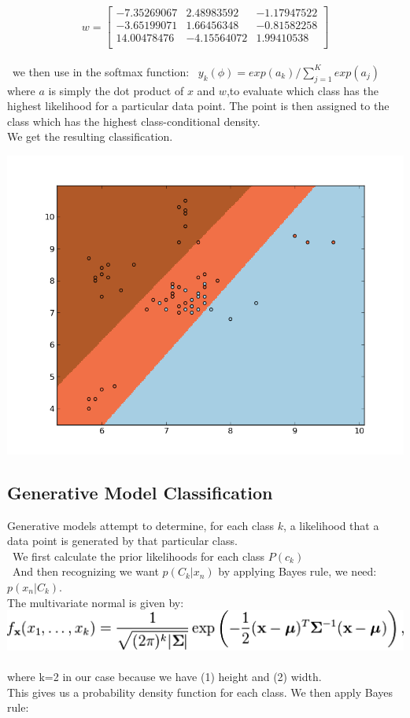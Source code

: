 \documentclass[11pt, oneside]{article}   	%
\begin{document}
\[
w=
  \begin{bmatrix}
    -7.35269067 & 2.48983592 & -1.17947522\\
    -3.65199071 & 1.66456348 & -0.81582258\\
    14.00478476 & -4.15564072 & 1.99410538\\	
	
  \end{bmatrix}
\]
\\
\
 we then use in the softmax function:
\
$y_k(\phi) = exp(a_k)/\sum\limits_{j=1}^K exp(a_j)$
\\
where $a$ is simply the dot product of $x$ and $w$,to evaluate which class has the highest likelihood for a particular data point. The point is then assigned to the class which has the highest class-conditional density.
\\
We get the resulting classification.

\includegraphics[scale=.6]{logistic_classifer}

\subsection*{Generative Model Classification}

Generative models attempt to determine, for each class $k$, a likelihood that a data point is generated by that particular class.
\\
\ We first calculate the prior likelihoods for each class $P(c_k)$
\\
\ And then recognizing we want $p(C_k |x_n)$ by applying Bayes rule, we need: $p(x_n |C_k)$.
\\
The multivariate normal is given by:
\
\\
\includegraphics[scale=.5]{formula}
\
\\
where k=2 in our case because we have (1) height and (2) width.
\
\\
This gives us a probability density function for each class. We then apply Bayes rule:
\end{document}
